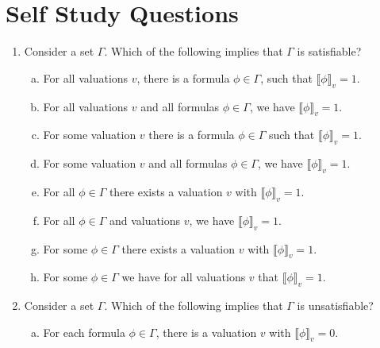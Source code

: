 \section{Self Study Questions}

	\begin{enumerate}[\thesection.1]
	
			\item Consider a set $\Gamma$. Which of the following implies that $\Gamma$ is satisfiable?
		
		\begin{enumerate}[(a)]

			\item For all valuations $v$, there is a formula $\phi\in\Gamma$, such that $\llbracket\phi\rrbracket_v=1$.
			
			\item For all valuations $v$ and all formulas $\phi\in\Gamma$, we have $\llbracket\phi\rrbracket_v=1$.
			
			\item For some valuation $v$ there is a formula $\phi\in\Gamma$ such that $\llbracket\phi\rrbracket_v=1$.
			
			\item For some valuation $v$ and all formulas $\phi\in\Gamma$, we have $\llbracket\phi\rrbracket_v=1$.
			
			\item For all $\phi\in\Gamma$ there exists a valuation $v$ with $\llbracket\phi\rrbracket_v=1$.
			
			\item For all $\phi\in\Gamma$ and valuations $v$, we have $\llbracket\phi\rrbracket_v=1$.
			
			\item For some $\phi\in\Gamma$ there exists a valuation $v$ with $\llbracket\phi\rrbracket_v=1$.

			\item For some $\phi\in\Gamma$ we have for all valuations $v$ that $\llbracket\phi\rrbracket_v=1$.

		\end{enumerate}
	
		\item Consider a set $\Gamma$. Which of the following implies that $\Gamma$ is unsatisfiable?
		
		\begin{enumerate}[(a)]
		
			\item For each formula $\phi\in\Gamma$, there is a valuation $v$ with $\llbracket\phi\rrbracket_v=0$.
			

\end{enumerate}
\end{enumerate}
